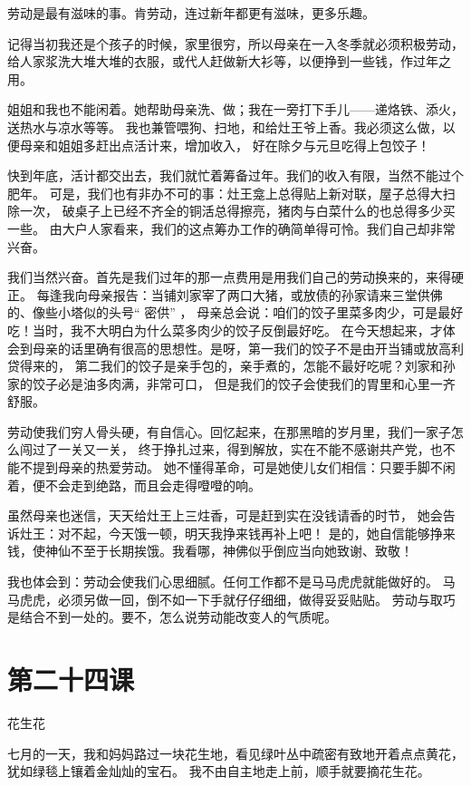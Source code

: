 \documentclass[12pt,UTF8]{ctexbook}
\begin{document}
劳动是最有滋味的事。肯劳动，连过新年都更有滋味，更多乐趣。

记得当初我还是个孩子的时候，家里很穷，所以母亲在一入冬季就必须积极劳动，
给人家浆洗大堆大堆的衣服，或代人赶做新大衫等，以便挣到一些钱，作过年之用。

姐姐和我也不能闲着。她帮助母亲洗、做；我在一旁打下手儿——递烙铁、添火，送热水与凉水等等。
我也兼管喂狗、扫地，和给灶王爷上香。我必须这么做，以便母亲和姐姐多赶出点活计来，增加收入，
好在除夕与元旦吃得上包饺子！

快到年底，活计都交出去，我们就忙着筹备过年。我们的收入有限，当然不能过个肥年。
可是，我们也有非办不可的事：灶王龛上总得贴上新对联，屋子总得大扫除一次，
破桌子上已经不齐全的铜活总得擦亮，猪肉与白菜什么的也总得多少买一些。
由大户人家看来，我们的这点筹办工作的确简单得可怜。我们自己却非常兴奋。

我们当然兴奋。首先是我们过年的那一点费用是用我们自己的劳动换来的，来得硬正。
每逢我向母亲报告：当铺刘家宰了两口大猪，或放债的孙家请来三堂供佛的、像些小塔似的头号“ 密供” ，
母亲总会说：咱们的饺子里菜多肉少，可是最好吃！当时，我不大明白为什么菜多肉少的饺子反倒最好吃。
在今天想起来，才体会到母亲的话里确有很高的思想性。是呀，第一我们的饺子不是由开当铺或放高利贷得来的，
第二我们的饺子是亲手包的，亲手煮的，怎能不最好吃呢？刘家和孙家的饺子必是油多肉满，非常可口，
但是我们的饺子会使我们的胃里和心里一齐舒服。

劳动使我们穷人骨头硬，有自信心。回忆起来，在那黑暗的岁月里，我们一家子怎么闯过了一关又一关，
终于挣扎过来，得到解放，实在不能不感谢共产党，也不能不提到母亲的热爱劳动。
她不懂得革命，可是她使儿女们相信：只要手脚不闲着，便不会走到绝路，而且会走得噔噔的响。

虽然母亲也迷信，天天给灶王上三炷香，可是赶到实在没钱请香的时节，
她会告诉灶王：对不起，今天饿一顿，明天我挣来钱再补上吧！
是的，她自信能够挣来钱，使神仙不至于长期挨饿。我看哪，神佛似乎倒应当向她致谢、致敬！

我也体会到：劳动会使我们心思细腻。任何工作都不是马马虎虎就能做好的。
马马虎虎，必须另做一回，倒不如一下手就仔仔细细，做得妥妥贴贴。
劳动与取巧是结合不到一处的。要不，怎么说劳动能改变人的气质呢。

\section{第二十四课}

花生花

七月的一天，我和妈妈路过一块花生地，看见绿叶丛中疏密有致地开着点点黄花，犹如绿毯上镶着金灿灿的宝石。
我不由自主地走上前，顺手就要摘花生花。
\end{document}
